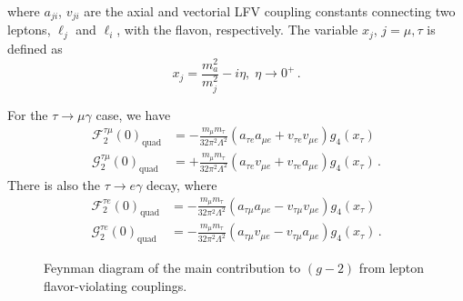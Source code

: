 \documentclass[prd,amsfonts,onecolumn,superscriptaddress,aps,nofootinbib,11pt]{revtex4-1}
\begin{document}
where $a_{ji}$, $v_{ji}$ are the axial and vectorial LFV coupling constants connecting two leptons, $\ell_j$ and $\ell_i$, with the flavon, respectively. The variable $x_j$, $j=\mu, \tau$ is defined as
\begin{equation}
    x_j = \frac{m_a^2}{m_j^2}-i\eta,\; \eta\to 0^+ \,.
\end{equation}

For the $\tau \to \mu \gamma$ case, we have
\begin{equation}\label{eq:FandGeta}
    \begin{split}
        \mathcal{F}^{\tau \mu}_2(0)_{\text{quad}} &= -\frac{m_\mu m_\tau}{32 \pi^2 \Lambda^2} (a_{\tau e} a_{\mu e} + v_{\tau e} v_{\mu e}) g_4(x_\tau) \\
        \mathcal{G}^{\tau \mu}_2(0)_{\text{quad}} &= +\frac{m_\mu m_\tau}{32 \pi^2 \Lambda^2} (a_{\tau e} v_{\mu e} + v_{\tau e} a_{\mu e}
        ) g_4(x_\tau) \,.
    \end{split}
\end{equation}
There is also the $\tau \to e \gamma$ decay, where
\begin{equation}\label{eq:FandGmuta}
    \begin{split}
        \mathcal{F}^{\tau e}_2(0)_{\text{quad}} &= -\frac{m_\mu m_\tau}{32 \pi^2 \Lambda^2} (a_{\tau \mu} a_{\mu e} - v_{\tau \mu} v_{\mu e}) g_4(x_\tau) \\
        \mathcal{G}^{\tau e}_2(0)_{\text{quad}} &= -\frac{m_\mu m_\tau}{32 \pi^2 \Lambda^2} (a_{\tau \mu} v_{\mu e} - v_{\tau \mu} a_{\mu e}) g_4(x_\tau) \,.
    \end{split}
\end{equation}

\begin{figure}
    \centering
    
    \caption{Feynman diagram of the main contribution to $(g-2)$ from lepton flavor-violating couplings.}
    \label{fig:g-2-tikz}
\end{figure}
\end{document}
